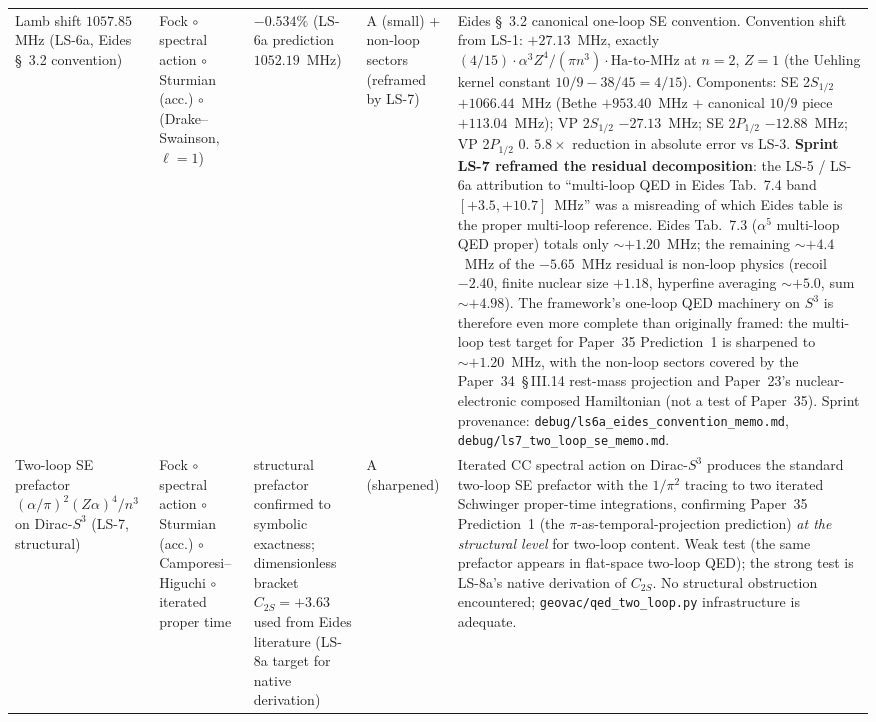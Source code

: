 \documentclass[11pt]{article}
\begin{document}
\begin{table}[h]
\begin{tabular}{p{3.8cm} p{2.5cm} p{1.5cm} p{1.4cm} p{4.5cm}}
Lamb shift $1057.85$ MHz (LS-6a, Eides \S~3.2 convention) & Fock
$\circ$ spectral action $\circ$ Sturmian (acc.) $\circ$ (Drake--Swainson,
$\ell=1$) & $-0.534\%$ (LS-6a prediction $1052.19$~MHz) & A (small) +
non-loop sectors (reframed by LS-7) & Eides \S~3.2 canonical one-loop
SE convention.  Convention shift from LS-1: $+27.13$~MHz, exactly
$(4/15) \cdot \alpha^3 Z^4 / (\pi n^3) \cdot \text{Ha-to-MHz}$ at
$n=2$, $Z=1$ (the Uehling kernel constant $10/9 - 38/45 = 4/15$).
Components: SE 2$S_{1/2}$ $+1066.44$~MHz (Bethe $+953.40$~MHz +
canonical $10/9$ piece $+113.04$~MHz); VP 2$S_{1/2}$ $-27.13$~MHz;
SE 2$P_{1/2}$ $-12.88$~MHz; VP 2$P_{1/2}$ $0$.  $5.8\times$
reduction in absolute error vs LS-3.  \textbf{Sprint LS-7 reframed
the residual decomposition}: the LS-5 / LS-6a attribution to
``multi-loop QED in Eides Tab.~7.4 band $[+3.5, +10.7]$~MHz'' was a
misreading of which Eides table is the proper multi-loop reference.
Eides Tab.~7.3 ($\alpha^5$ multi-loop QED proper) totals only
$\sim +1.20$~MHz; the remaining $\sim +4.4$~MHz of the $-5.65$~MHz
residual is non-loop physics (recoil $-2.40$, finite nuclear size
$+1.18$, hyperfine averaging $\sim +5.0$, sum $\sim +4.98$).  The
framework's one-loop QED machinery on $S^3$ is therefore even more
complete than originally framed: the multi-loop test target for
Paper~35 Prediction~1 is sharpened to $\sim +1.20$~MHz, with the
non-loop sectors covered by the Paper~34~\S\,III.14 rest-mass
projection and Paper~23's nuclear-electronic composed Hamiltonian
(not a test of Paper~35).  Sprint provenance:
\texttt{debug/ls6a\_eides\_convention\_memo.md},
\texttt{debug/ls7\_two\_loop\_se\_memo.md}. \\
Two-loop SE prefactor $(\alpha/\pi)^2 (Z\alpha)^4 / n^3$ on
Dirac-$S^3$ (LS-7, structural) & Fock $\circ$ spectral action
$\circ$ Sturmian (acc.) $\circ$ Camporesi--Higuchi $\circ$ iterated
proper time & structural prefactor confirmed to symbolic exactness;
dimensionless bracket $C_{2S} = +3.63$ used from Eides literature
(LS-8a target for native derivation) & A (sharpened) & Iterated CC
spectral action on Dirac-$S^3$ produces the standard two-loop SE
prefactor with the $1/\pi^2$ tracing to two iterated Schwinger
proper-time integrations, confirming Paper~35 Prediction~1 (the
$\pi$-as-temporal-projection prediction) \emph{at the structural
level} for two-loop content.  Weak test (the same prefactor appears in
flat-space two-loop QED); the strong test is LS-8a's native
derivation of $C_{2S}$.  No structural obstruction encountered;
\texttt{geovac/qed\_two\_loop.py} infrastructure is adequate.

\end{tabular}
\end{table}
\end{document}
